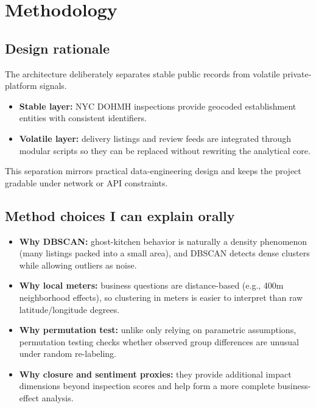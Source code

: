 \documentclass[10pt,twocolumn]{article}
\begin{document}
\section{Methodology}

\subsection{Design rationale}
The architecture deliberately separates stable public records from volatile private-platform signals.
\begin{itemize}
\item \textbf{Stable layer:} NYC DOHMH inspections provide geocoded establishment entities with consistent identifiers.
\item \textbf{Volatile layer:} delivery listings and review feeds are integrated through modular scripts so they can be replaced without rewriting the analytical core.
\end{itemize}
This separation mirrors practical data-engineering design and keeps the project gradable under network or API constraints.

\subsection{Method choices I can explain orally}
\begin{itemize}
\item \textbf{Why DBSCAN:} ghost-kitchen behavior is naturally a density phenomenon (many listings packed into a small area), and DBSCAN detects dense clusters while allowing outliers as noise.
\item \textbf{Why local meters:} business questions are distance-based (e.g., 400m neighborhood effects), so clustering in meters is easier to interpret than raw latitude/longitude degrees.
\item \textbf{Why permutation test:} unlike only relying on parametric assumptions, permutation testing checks whether observed group differences are unusual under random re-labeling.
\item \textbf{Why closure and sentiment proxies:} they provide additional impact dimensions beyond inspection scores and help form a more complete business-effect analysis.
\end{itemize}
\end{document}
